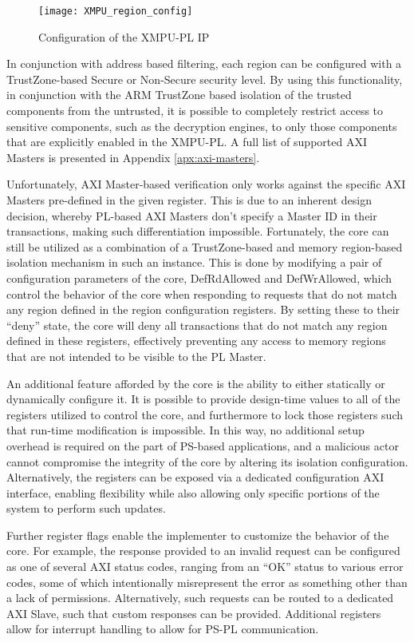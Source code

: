 \begin{figure}[h]
    \centering
    \texttt{[image: XMPU\_region\_config]}
    \caption[XMPU Region Configuration]{Configuration of the XMPU-PL IP}
    \label{fig:XMPU_region_config}
\end{figure}

In conjunction with address based filtering, each region can be configured with a TrustZone-based Secure or Non-Secure security level. By using this functionality, in conjunction with the ARM TrustZone based isolation of the trusted components from the untrusted, it is possible to completely restrict access to sensitive components, such as the decryption engines, to only those components that are explicitly enabled in the XMPU-PL. A full list of supported AXI Masters is presented in Appendix \ref{apx:axi-masters}.

Unfortunately, AXI Master-based verification only works against the specific AXI Masters pre-defined in the given register. This is due to an inherent design decision, whereby PL-based AXI Masters don't specify a Master ID in their transactions, making such differentiation impossible. Fortunately, the core can still be utilized as a combination of a TrustZone-based and memory region-based isolation mechanism in such an instance. This is done by modifying a pair of configuration parameters of the core, DefRdAllowed and DefWrAllowed, which control the behavior of the core when responding to requests that do not match any region defined in the region configuration registers. By setting these to their ``deny'' state, the core will deny all transactions that do not match any region defined in these registers, effectively preventing any access to memory regions that are not intended to be visible to the PL Master.

An additional feature afforded by the core is the ability to either statically or dynamically configure it. It is possible to provide design-time values to all of the registers utilized to control the core, and furthermore to lock those registers such that run-time modification is impossible. In this way, no additional setup overhead is required on the part of PS-based applications, and a malicious actor cannot compromise the integrity of the core by altering its isolation configuration. Alternatively, the registers can be exposed via a dedicated configuration AXI interface, enabling flexibility while also allowing only specific portions of the system to perform such updates.

Further register flags enable the implementer to customize the behavior of the core. For example, the response provided to an invalid request can be configured as one of several AXI status codes, ranging from an ``OK'' status to various error codes, some of which intentionally misrepresent the error as something other than a lack of permissions. Alternatively, such requests can be routed to a dedicated AXI Slave, such that custom responses can be provided. Additional registers allow for interrupt handling to allow for PS-PL communication.


